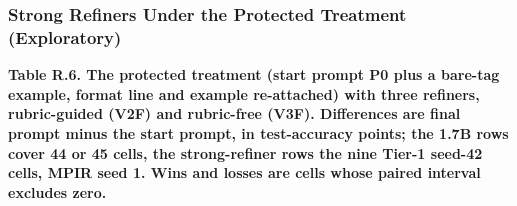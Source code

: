 \documentclass{ieeeaccess}
\begin{document}
\subsubsection{Strong Refiners Under the Protected Treatment (Exploratory)}

\begin{table}[htbp]
\centering
\footnotesize
\par\noindent\textbf{Table R.6. The protected treatment (start prompt P0 plus a bare-tag example, format line and example re-attached) with three refiners, rubric-guided (V2F) and rubric-free (V3F). Differences are final prompt minus the start prompt, in test-accuracy points; the 1.7B rows cover 44 or 45 cells, the strong-refiner rows the nine Tier-1 seed-42 cells, MPIR seed 1. Wins and losses are cells whose paired interval excludes zero.}
\end{table}
\end{document}
